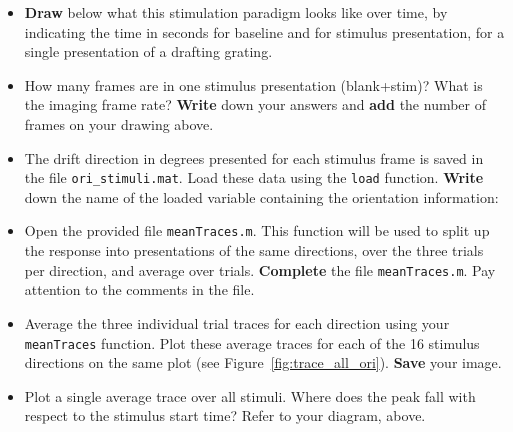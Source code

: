 \documentclass[paper=a4, fontsize=11pt]{scrartcl} %
\numberwithin{equation}{section} %
\numberwithin{figure}{section} %
\numberwithin{table}{section} %
\begin{document}
\begin{itemize}
\item \textbf{Draw} below what this stimulation paradigm looks like over time, by indicating the time in seconds for baseline and for stimulus presentation, for a single presentation of a drafting grating.
  \vspace{3in}
\item How many frames are in one stimulus presentation (blank+stim)? What is the imaging frame rate? \textbf{Write} down your answers and \textbf{add} the number of frames on your drawing above.
\item The drift direction in degrees presented for each stimulus frame is saved in the file \texttt{ori\_stimuli.mat}.
  Load these data using the \texttt{load} function. \textbf{Write} down the name of the loaded variable containing the orientation information:
\item Open the provided file \texttt{meanTraces.m}. This function will be used to split up the response into presentations of the same directions, over the three trials per direction, and average over trials. \textbf{Complete} the file \texttt{meanTraces.m}. Pay attention to the comments in the file.
\item Average the three individual trial traces for each direction using your \texttt{meanTraces} function. Plot these average traces for each of the 16 stimulus directions on the same plot (see Figure~\ref{fig:trace_all_ori}). \textbf{Save} your image.
\item Plot a single average trace over all stimuli. Where does the peak fall with respect to the stimulus start time? Refer to your diagram, above.
\end{itemize}
\end{document}
